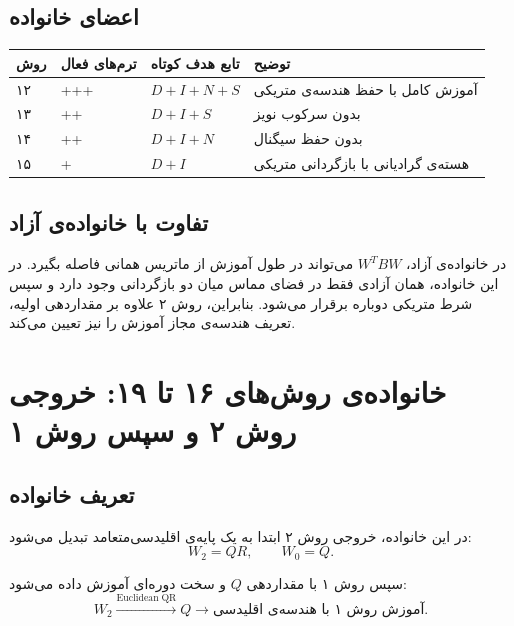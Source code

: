 \documentclass[a4paper,12pt]{article}
\newcommand{\QR}{\lr{QR}}
\newcommand{\Dterm}{\lr{D}}
\newcommand{\Iterm}{\lr{I}}
\newcommand{\Nterm}{\lr{N}}
\newcommand{\Sterm}{\lr{S}}
\begin{document}
\subsection{اعضای خانواده}

\begin{center}
\begin{tabularx}{0.96\textwidth}{|C{1.5cm}|C{3.3cm}|C{4cm}|X|}
\hline
\textbf{روش} & \textbf{ترم‌های فعال} & \textbf{تابع هدف کوتاه} & \textbf{توضیح} \\
\hline
۱۲ & \Dterm{}+\Iterm{}+\Nterm{}+\Sterm{} & $D+I+N+S$ & آموزش کامل با حفظ هندسه‌ی متریکی \\
\hline
۱۳ & \Dterm{}+\Iterm{}+\Sterm{} & $D+I+S$ & بدون سرکوب نویز \\
\hline
۱۴ & \Dterm{}+\Iterm{}+\Nterm{} & $D+I+N$ & بدون حفظ سیگنال \\
\hline
۱۵ & \Dterm{}+\Iterm{} & $D+I$ & هسته‌ی گرادیانی با بازگردانی متریکی \\
\hline
\end{tabularx}
\end{center}

\subsection{تفاوت با خانواده‌ی آزاد}

در خانواده‌ی آزاد، $W^{T}BW$ می‌تواند در طول آموزش از ماتریس همانی فاصله بگیرد. در این خانواده، همان آزادی فقط در فضای مماس میان دو بازگردانی وجود دارد و سپس شرط متریکی دوباره برقرار می‌شود. بنابراین، روش ۲ علاوه بر مقداردهی اولیه، تعریف هندسه‌ی مجاز آموزش را نیز تعیین می‌کند.

\section{خانواده‌ی روش‌های ۱۶ تا ۱۹: \QR{} خروجی روش ۲ و سپس روش ۱}

\subsection{تعریف خانواده}

در این خانواده، خروجی روش ۲ ابتدا به یک پایه‌ی اقلیدسی‌متعامد تبدیل می‌شود:
\begin{equation}
 W_2=QR,
 \qquad
 W_0=Q.
\end{equation}

سپس روش ۱ با مقداردهی $Q$ و \QR{} سخت دوره‌ای آموزش داده می‌شود:
\begin{equation}
 W_2
 \xrightarrow{\mathrm{Euclidean\;QR}}
 Q
 \longrightarrow
 \text{آموزش روش ۱ با هندسه‌ی اقلیدسی}.
\end{equation}
\end{document}

